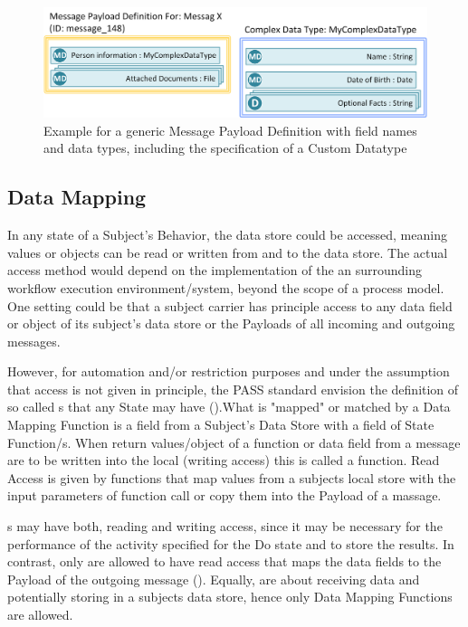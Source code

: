 \begin{figure}[htbp]
	\centering
	\includegraphics[width=14cm]{Figures/ExamplePayloadAndTypeDefinitions.png}
	\caption[Example for a generic Message Payload Definition with field names and data types, including the specification of a Custom Datatype]{Example for a generic Message Payload Definition with field names and data types, including the specification of a Custom Datatype}
	\label{fig:examplePayloadDef}
\end{figure}

\subsection{Data Mapping}

In any state of a Subject's Behavior, the data store could be accessed, meaning values or objects can be read or written from and to the data store. The actual access method would depend on the implementation of the an surrounding workflow execution environment/system, beyond the scope of a process model. One setting could be that a subject carrier has principle access to any data field or object of its subject's data store or the Payloads of all incoming and outgoing messages. 

However, for automation and/or restriction purposes and under the assumption that access is not given in principle, the PASS standard envision the definition of so called s that any State may have ().What is "mapped" or matched by a Data Mapping Function is a field from a Subject's Data Store with a field of State Function/s. When return values/object of a function or data field from a message are to be written into the local (writing access) this is called a  function. Read Access is given by 
 functions that map values from a subjects local store with the input parameters of function call or copy them into the Payload of a massage. 

s may have both, reading and writing access, since it may be necessary for the performance of the activity specified for the Do state and to store the results. In contrast,  only are allowed to have read access that maps the data fields to the Payload of the outgoing message (). Equally,  are about receiving data and potentially storing in a subjects data store, hence only  Data Mapping Functions are allowed.

